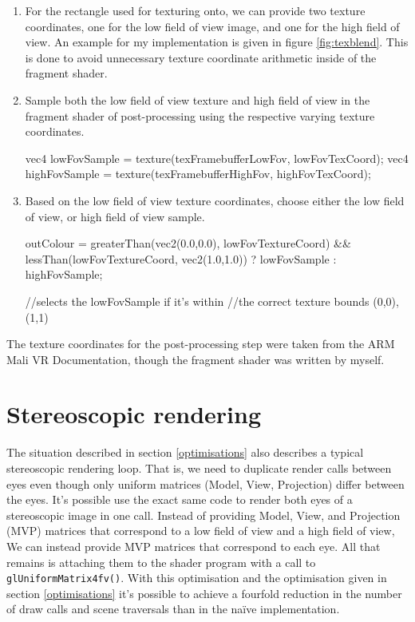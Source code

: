 \documentclass[12pt,a4paper,twoside,openright]{report}
\begin{document}
\begin{enumerate}
\item For the rectangle used for texturing onto, we can provide two texture coordinates, one for the low field of view image, and one for the high field of view. An example for my implementation is given in figure \ref{fig:texblend}. This is done to avoid unnecessary texture coordinate arithmetic inside of the fragment shader.
\item Sample both the low field of view texture and high field of view in the fragment shader of post-processing using the respective varying texture coordinates.
\begin{blockcode}
	vec4 lowFovSample = texture(texFramebufferLowFov, lowFovTexCoord);
	vec4 highFovSample = texture(texFramebufferHighFov, highFovTexCoord);
\end{blockcode}

\item Based on the low field of view texture coordinates, choose either the low field of view, or high field of view sample.

\begin{blockcode}	
	outColour = greaterThan(vec2(0.0,0.0), lowFovTextureCoord) && 
				lessThan(lowFovTextureCoord, vec2(1.0,1.0)) 
				? lowFovSample : highFovSample;

	//selects the lowFovSample if it's within 
	//the correct texture bounds (0,0), (1,1) 
\end{blockcode}
\end{enumerate}

The texture coordinates for the post-processing step were taken from the ARM Mali VR Documentation\cite{armDeveloper}, though the fragment shader was written by myself. 

\section{Stereoscopic rendering}

The situation described in section \ref{optimisations} also describes a typical stereoscopic rendering loop. That is, we need to duplicate render calls between eyes even though only uniform matrices (Model, View, Projection) differ between the eyes. It's possible use the exact same code to render both eyes of a stereoscopic image in one call. Instead of providing Model, View, and Projection (MVP) matrices that correspond to a low field of view and a high field of view, We can instead provide MVP matrices that correspond to each eye. All that remains is attaching them to the shader program with a call to \texttt{glUniformMatrix4fv()}. With this optimisation and the optimisation given in section \ref{optimisations} it's possible to achieve a fourfold reduction in the number of draw calls and scene traversals than in the na\"ive implementation.
\end{document}
